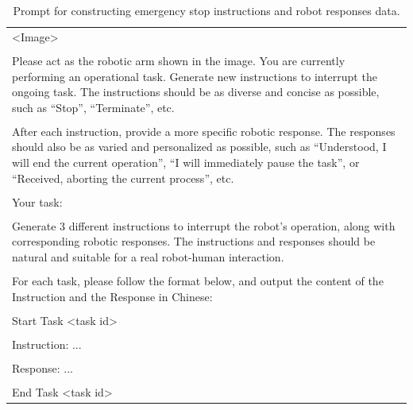 \begin{table}[h!]\centering
\begin{minipage}{0.99\columnwidth}\vspace{0mm}    \centering
\begin{tcolorbox}
    \centering
   
     \hspace{-4mm}
      \scriptsize
    \begin{tabular}{p{}}
\textless Image\textgreater \\
\\
Please act as the robotic arm shown in the image. You are currently performing an operational task. Generate new instructions to interrupt the ongoing task. The instructions should be as diverse and concise as possible, such as ``Stop'', ``Terminate'', etc. \\
\\
After each instruction, provide a more specific robotic response. The responses should also be as varied and personalized as possible, such as ``Understood, I will end the current operation'', ``I will immediately pause the task'', or ``Received, aborting the current process'', etc. \\
\\
Your task: \\
\\
Generate 3 different instructions to interrupt the robot's operation, along with corresponding robotic responses. The instructions and responses should be natural and suitable for a real robot-human interaction. \\
\\
For each task, please follow the format below, and output the content of the Instruction and the Response in Chinese: \\
\\
Start Task \textless task id\textgreater \\
\\
Instruction: ... \\
\\
Response: ... \\
\\
End Task \textless task id\textgreater
    \end{tabular}
\end{tcolorbox}
\vspace{-2mm}
\caption{Prompt for constructing emergency stop instructions and robot responses data.}
    \label{tab:prompt3}
\end{minipage}
\end{table}

